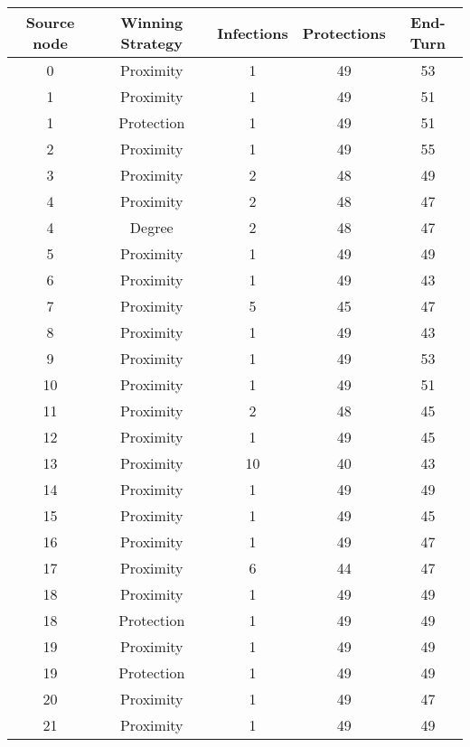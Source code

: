 \documentclass[results.tex]{subfiles}
\begin{document}
\begin{center}
  \begin{tabular}{| c || c | c | c | c |}
    \hline
    {\bfseries Source node} & {\bfseries Winning Strategy} & {\bfseries Infections} & {\bfseries Protections} & {\bfseries End-Turn} \\  %
    \hline\hline
    0 & Proximity & 1 & 49 & 53 \\ 
    \hline
    1 & Proximity & 1 & 49 & 51 \\ 
    \hline
    1 & Protection & 1 & 49 & 51 \\ 
    \hline
    2 & Proximity & 1 & 49 & 55 \\ 
    \hline
    3 & Proximity & 2 & 48 & 49 \\ 
    \hline
    4 & Proximity & 2 & 48 & 47 \\ 
    \hline
    4 & Degree & 2 & 48 & 47 \\ 
    \hline
    5 & Proximity & 1 & 49 & 49 \\ 
    \hline
    6 & Proximity & 1 & 49 & 43 \\ 
    \hline
    7 & Proximity & 5 & 45 & 47 \\ 
    \hline
    8 & Proximity & 1 & 49 & 43 \\ 
    \hline
    9 & Proximity & 1 & 49 & 53 \\ 
    \hline
    10 & Proximity & 1 & 49 & 51 \\ 
    \hline
    11 & Proximity & 2 & 48 & 45 \\ 
    \hline
    12 & Proximity & 1 & 49 & 45 \\ 
    \hline
    13 & Proximity & 10 & 40 & 43 \\ 
    \hline
    14 & Proximity & 1 & 49 & 49 \\ 
    \hline
    15 & Proximity & 1 & 49 & 45 \\ 
    \hline
    16 & Proximity & 1 & 49 & 47 \\ 
    \hline
    17 & Proximity & 6 & 44 & 47 \\ 
    \hline
    18 & Proximity & 1 & 49 & 49 \\ 
    \hline
    18 & Protection & 1 & 49 & 49 \\ 
    \hline
    19 & Proximity & 1 & 49 & 49 \\ 
    \hline
    19 & Protection & 1 & 49 & 49 \\ 
    \hline
    20 & Proximity & 1 & 49 & 47 \\ 
    \hline
    21 & Proximity & 1 & 49 & 49 \\ 

\end{tabular}
\end{center}
\end{document}
